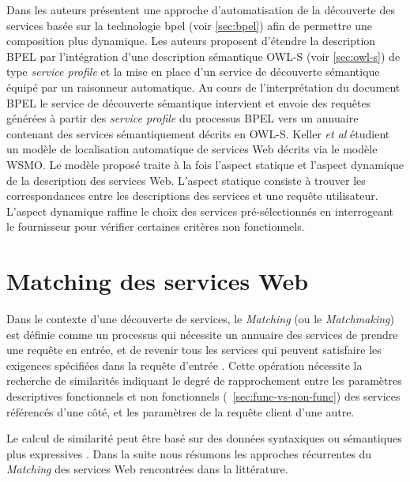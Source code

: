     Dans \cite{mandell2003bottom} les auteurs présentent une approche
    d'automatisation de la découverte des services basée sur la
    technologie \acrshort{bpel} (voir \ref{sec:bpel}) afin de
    permettre une composition plus dynamique. Les auteurs proposent
    d'étendre la description \textsc{BPEL} par l'intégration d'une
    description sémantique \textsc{OWL-S} (voir \ref{sec:owl-s}) de
    type \textit{service profile} et la mise en place d'un service de
    découverte sémantique équipé par un raisonneur automatique. Au
    cours de l'interprétation du document \textsc{BPEL} le service de
    découverte sémantique intervient et envoie des requêtes générées à
    partir des \textit{service profile} du processus \textsc{ BPEL}
    vers un annuaire contenant des services sémantiquement décrits en
    \textsc{OWL-S}.
    Keller \textit{et al} \cite{keller2005automatic} étudient un
    modèle de localisation automatique de services Web décrits via le
    modèle \textsc{WSMO}. Le modèle proposé traite à la fois l'aspect
    statique et l'aspect dynamique de la description des services
    Web. L'aspect statique consiste à trouver les correspondances
    entre les descriptions des services et une requête
    utilisateur. L'aspect dynamique raffine le choix des services
    pré-sélectionnés en interrogeant le fournisseur pour vérifier
    certaines critères non fonctionnels.
    \newpage

\section{Matching des services Web}
\label{sec:ws-matching}

Dans le contexte d'une découverte de services, le \textit{Matching}
(ou le \textit{Matchmaking}) est définie comme un processus qui
nécessite un annuaire des services de prendre une requête en entrée,
et de revenir tous les services qui peuvent satisfaire les exigences
spécifiées dans la requête d'entrée \cite{li2004software}. Cette
opération nécessite la recherche de similarités indiquant le degré de
rapprochement entre les paramètres descriptives fonctionnels et
non fonctionnels (~\ref{sec:func-vs-non-func}) des services référencés
d'une côté, et les paramètres de la requête client d'une autre.

Le calcul de similarité peut être basé sur des données syntaxiques ou
sémantiques plus expressives \cite{elie2010}. Dans la suite nous
résumons les approches récurrentes du \textit{Matching} des services
Web rencontrées dans la littérature.

